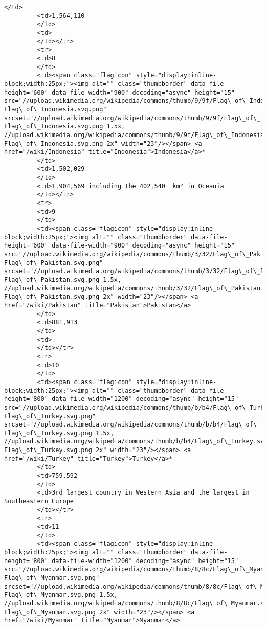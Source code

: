\documentclass[11pt]{article}
\begin{document}
\begin{Verbatim}[commandchars=\\\{\}]
         </td>
         <td>1,564,110
         </td>
         <td>
         </td></tr>
         <tr>
         <td>8
         </td>
         <td><span class="flagicon" style="display:inline-block;width:25px;"><img alt="" class="thumbborder" data-file-height="600" data-file-width="900" decoding="async" height="15" src="//upload.wikimedia.org/wikipedia/commons/thumb/9/9f/Flag\_of\_Indonesia.svg/23px-Flag\_of\_Indonesia.svg.png" srcset="//upload.wikimedia.org/wikipedia/commons/thumb/9/9f/Flag\_of\_Indonesia.svg/35px-Flag\_of\_Indonesia.svg.png 1.5x, //upload.wikimedia.org/wikipedia/commons/thumb/9/9f/Flag\_of\_Indonesia.svg/45px-Flag\_of\_Indonesia.svg.png 2x" width="23"/></span> <a href="/wiki/Indonesia" title="Indonesia">Indonesia</a>*
         </td>
         <td>1,502,029
         </td>
         <td>1,904,569 including the 402,540  km² in Oceania
         </td></tr>
         <tr>
         <td>9
         </td>
         <td><span class="flagicon" style="display:inline-block;width:25px;"><img alt="" class="thumbborder" data-file-height="600" data-file-width="900" decoding="async" height="15" src="//upload.wikimedia.org/wikipedia/commons/thumb/3/32/Flag\_of\_Pakistan.svg/23px-Flag\_of\_Pakistan.svg.png" srcset="//upload.wikimedia.org/wikipedia/commons/thumb/3/32/Flag\_of\_Pakistan.svg/35px-Flag\_of\_Pakistan.svg.png 1.5x, //upload.wikimedia.org/wikipedia/commons/thumb/3/32/Flag\_of\_Pakistan.svg/45px-Flag\_of\_Pakistan.svg.png 2x" width="23"/></span> <a href="/wiki/Pakistan" title="Pakistan">Pakistan</a>
         </td>
         <td>881,913
         </td>
         <td>
         </td></tr>
         <tr>
         <td>10
         </td>
         <td><span class="flagicon" style="display:inline-block;width:25px;"><img alt="" class="thumbborder" data-file-height="800" data-file-width="1200" decoding="async" height="15" src="//upload.wikimedia.org/wikipedia/commons/thumb/b/b4/Flag\_of\_Turkey.svg/23px-Flag\_of\_Turkey.svg.png" srcset="//upload.wikimedia.org/wikipedia/commons/thumb/b/b4/Flag\_of\_Turkey.svg/35px-Flag\_of\_Turkey.svg.png 1.5x, //upload.wikimedia.org/wikipedia/commons/thumb/b/b4/Flag\_of\_Turkey.svg/45px-Flag\_of\_Turkey.svg.png 2x" width="23"/></span> <a href="/wiki/Turkey" title="Turkey">Turkey</a>*
         </td>
         <td>759,592
         </td>
         <td>3rd largest country in Western Asia and the largest in Southeastern Europe
         </td></tr>
         <tr>
         <td>11
         </td>
         <td><span class="flagicon" style="display:inline-block;width:25px;"><img alt="" class="thumbborder" data-file-height="800" data-file-width="1200" decoding="async" height="15" src="//upload.wikimedia.org/wikipedia/commons/thumb/8/8c/Flag\_of\_Myanmar.svg/23px-Flag\_of\_Myanmar.svg.png" srcset="//upload.wikimedia.org/wikipedia/commons/thumb/8/8c/Flag\_of\_Myanmar.svg/35px-Flag\_of\_Myanmar.svg.png 1.5x, //upload.wikimedia.org/wikipedia/commons/thumb/8/8c/Flag\_of\_Myanmar.svg/45px-Flag\_of\_Myanmar.svg.png 2x" width="23"/></span> <a href="/wiki/Myanmar" title="Myanmar">Myanmar</a>

\end{Verbatim}
\end{document}
